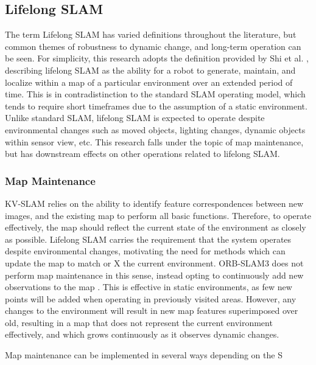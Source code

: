 \subsection{Lifelong SLAM}

The term Lifelong SLAM has varied definitions throughout the literature, but common themes of robustness to dynamic change, and long-term operation can be seen. For simplicity, this research adopts the definition provided by Shi et al. \cite{shiAreWeReady2020}, describing lifelong SLAM as the ability for a robot to generate, maintain, and localize within a map of a particular environment over an extended period of time. This is in contradistinction to the standard SLAM operating model, which tends to require short timeframes due to the assumption of a static environment. Unlike standard SLAM, lifelong SLAM is expected to operate despite environmental changes such as moved objects, lighting changes, dynamic objects within sensor view, etc. This research falls under the topic of map maintenance, but has downstream effects on other operations related to lifelong SLAM.

\subsubsection{Map Maintenance}

KV-SLAM relies on the ability to identify feature correspondences between new images, and the existing map to perform all basic functions. Therefore, to operate effectively, the map should reflect the current state of the environment as closely as possible. Lifelong SLAM carries the requirement that the system operates despite environmental changes, motivating the need for methods which can update the map to match or X the current environment. ORB-SLAM3 does not perform map maintenance in this sense, instead opting to continuously add new observations to the map \cite{camposORBSLAM3AccurateOpenSource2021}. This is effective in static environments, as few new points will be added when operating in previously visited areas. However, any changes to the environment will result in new map features superimposed over old, resulting in a map that does not represent the current environment effectively, and which grows continuously as it observes dynamic changes.

Map maintenance can be implemented in several ways depending on the S

\subsubsection{}
